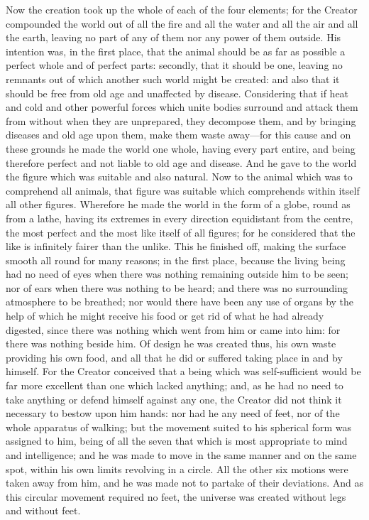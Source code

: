 \documentclass[11pt,letter]{article}
\begin{document}
\par  Now the creation took up the whole of each of the four elements; for the Creator compounded the world out of all the fire and all the water and all the air and all the earth, leaving no part of any of them nor any power of them outside. His intention was, in the first place, that the animal should be as far as possible a perfect whole and of perfect parts: secondly, that it should be one, leaving no remnants out of which another such world might be created: and also that it should be free from old age and unaffected by disease. Considering that if heat and cold and other powerful forces which unite bodies surround and attack them from without when they are unprepared, they decompose them, and by bringing diseases and old age upon them, make them waste away—for this cause and on these grounds he made the world one whole, having every part entire, and being therefore perfect and not liable to old age and disease. And he gave to the world the figure which was suitable and also natural. Now to the animal which was to comprehend all animals, that figure was suitable which comprehends within itself all other figures. Wherefore he made the world in the form of a globe, round as from a lathe, having its extremes in every direction equidistant from the centre, the most perfect and the most like itself of all figures; for he considered that the like is infinitely fairer than the unlike. This he finished off, making the surface smooth all round for many reasons; in the first place, because the living being had no need of eyes when there was nothing remaining outside him to be seen; nor of ears when there was nothing to be heard; and there was no surrounding atmosphere to be breathed; nor would there have been any use of organs by the help of which he might receive his food or get rid of what he had already digested, since there was nothing which went from him or came into him: for there was nothing beside him. Of design he was created thus, his own waste providing his own food, and all that he did or suffered taking place in and by himself. For the Creator conceived that a being which was self-sufficient would be far more excellent than one which lacked anything; and, as he had no need to take anything or defend himself against any one, the Creator did not think it necessary to bestow upon him hands: nor had he any need of feet, nor of the whole apparatus of walking; but the movement suited to his spherical form was assigned to him, being of all the seven that which is most appropriate to mind and intelligence; and he was made to move in the same manner and on the same spot, within his own limits revolving in a circle. All the other six motions were taken away from him, and he was made not to partake of their deviations. And as this circular movement required no feet, the universe was created without legs and without feet.
\end{document}

